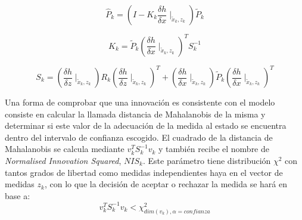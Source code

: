  \begin{equation}\label{eq:P_estimationEKF_im}
    \hat{P}_{k} = (I-K_{k}\frac{\delta h}{\delta x}\mid_{\tilde{x}_{k},z_{k}})\tilde{P}_{k}
\end{equation}

\begin{equation}\label{eq:KEKF_im}
    K_{k} = \tilde{P}_{k}(\frac{\delta h}{\delta x}\mid_{\tilde{x}_{k},z_{k}})^{T}S_{k}^{-1}
\end{equation}

\begin{equation}\label{eq:SEKF_im}
    S_{k} = (\frac{\delta h}{\delta z} \mid _{\tilde{x}_{k},z_{k}}) R_{k} (\frac{\delta h}{\delta z} \mid _{\tilde{x}_{k},z_{k}})^{T}+(\frac{\delta h}{\delta x}\mid_{\tilde{x}_{k},z_{k}})\tilde{P}_{k} (\frac{\delta h}{\delta x}\mid_{\tilde{x}_{k},z_{k}})^{T}
\end{equation}

Una forma de comprobar que una innovación es consistente con el modelo consiste en calcular la llamada distancia de Mahalanobis de la misma y determinar si este valor de la adecuación de la medida al estado se encuentra dentro del intervalo de confianza escogido. El cuadrado de la distancia de Mahalanobis se calcula mediante $v_{k}^{T}S_{k}^{-1}v_{k}$ y también recibe el nombre de \emph{Normalised Innovation Squared}, $NIS_{k}$. Este parámetro tiene distribución $\chi^{2}$ con tantos grados de libertad como medidas independientes haya en el vector de medidas $z_{k}$, con lo que la decisión de aceptar o rechazar la medida se hará en base a:
\begin{equation}\label{eq:mahalanobis}
    v_{k}^{T}S_{k}^{-1}v_{k}<\chi^{2}_{dim(v_{k}),\alpha = confianza}
\end{equation}

